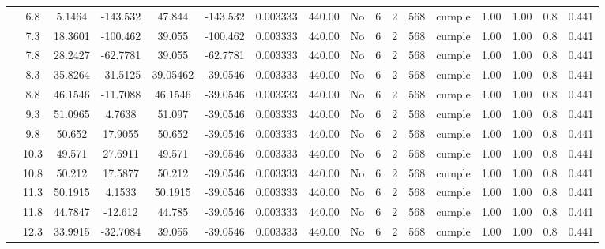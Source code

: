 \begin{table}[H]
{\begin{tabular}{|c|c|c|c|c|c|c|c|c|c|c|c|c|c|c|c|c|}
\cline{2-17}    & \cellcolor[rgb]{ .851,  .882,  .949}6.8 & 5.1464 & -143.532 & 47.844 & -143.532 & 0.003333 & 440.00 & No  & 6   & 2   & 568 & \cellcolor[rgb]{ .776,  .937,  .808}cumple & 1.00 & 1.00 & 0.8 & 0.441 \bigstrut\\
\cline{2-17}    & 7.3 & 18.3601 & -100.462 & 39.055 & -100.462 & 0.003333 & 440.00 & No  & 6   & 2   & 568 & \cellcolor[rgb]{ .776,  .937,  .808}cumple & 1.00 & 1.00 & 0.8 & 0.441 \bigstrut\\
\cline{2-17}    & 7.8 & 28.2427 & -62.7781 & 39.055 & -62.7781 & 0.003333 & 440.00 & No  & 6   & 2   & 568 & \cellcolor[rgb]{ .776,  .937,  .808}cumple & 1.00 & 1.00 & 0.8 & 0.441 \bigstrut\\
\cline{2-17}    & 8.3 & 35.8264 & -31.5125 & 39.05462 & -39.0546 & 0.003333 & 440.00 & No  & 6   & 2   & 568 & \cellcolor[rgb]{ .776,  .937,  .808}cumple & 1.00 & 1.00 & 0.8 & 0.441 \bigstrut\\
\cline{2-17}    & 8.8 & 46.1546 & -11.7088 & 46.1546 & -39.0546 & 0.003333 & 440.00 & No  & 6   & 2   & 568 & \cellcolor[rgb]{ .776,  .937,  .808}cumple & 1.00 & 1.00 & 0.8 & 0.441 \bigstrut\\
\cline{2-17}    & 9.3 & 51.0965 & 4.7638 & 51.097 & -39.0546 & 0.003333 & 440.00 & No  & 6   & 2   & 568 & \cellcolor[rgb]{ .776,  .937,  .808}cumple & 1.00 & 1.00 & 0.8 & 0.441 \bigstrut\\
\cline{2-17}    & 9.8 & 50.652 & 17.9055 & 50.652 & -39.0546 & 0.003333 & 440.00 & No  & 6   & 2   & 568 & \cellcolor[rgb]{ .776,  .937,  .808}cumple & 1.00 & 1.00 & 0.8 & 0.441 \bigstrut\\
\cline{2-17}    & 10.3 & 49.571 & 27.6911 & 49.571 & -39.0546 & 0.003333 & 440.00 & No  & 6   & 2   & 568 & \cellcolor[rgb]{ .776,  .937,  .808}cumple & 1.00 & 1.00 & 0.8 & 0.441 \bigstrut\\
\cline{2-17}    & 10.8 & 50.212 & 17.5877 & 50.212 & -39.0546 & 0.003333 & 440.00 & No  & 6   & 2   & 568 & \cellcolor[rgb]{ .776,  .937,  .808}cumple & 1.00 & 1.00 & 0.8 & 0.441 \bigstrut\\
\cline{2-17}    & 11.3 & 50.1915 & 4.1533 & 50.1915 & -39.0546 & 0.003333 & 440.00 & No  & 6   & 2   & 568 & \cellcolor[rgb]{ .776,  .937,  .808}cumple & 1.00 & 1.00 & 0.8 & 0.441 \bigstrut\\
\cline{2-17}    & 11.8 & 44.7847 & -12.612 & 44.785 & -39.0546 & 0.003333 & 440.00 & No  & 6   & 2   & 568 & \cellcolor[rgb]{ .776,  .937,  .808}cumple & 1.00 & 1.00 & 0.8 & 0.441 \bigstrut\\
\cline{2-17}    & 12.3 & 33.9915 & -32.7084 & 39.055 & -39.0546 & 0.003333 & 440.00 & No  & 6   & 2   & 568 & \cellcolor[rgb]{ .776,  .937,  .808}cumple & 1.00 & 1.00 & 0.8 & 0.441 \bigstrut\\

\end{tabular}}
\end{table}
